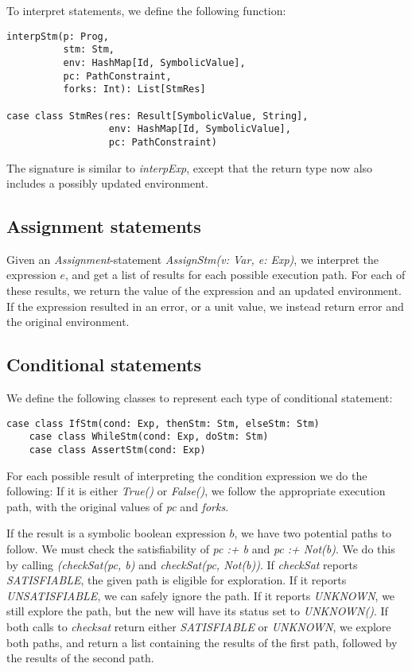 To interpret statements, we define the following function:

\begin{lstlisting}[style=simple]
interpStm(p: Prog, 
		  stm: Stm, 
		  env: HashMap[Id, SymbolicValue], 
		  pc: PathConstraint,
		  forks: Int): List[StmRes]
			  
case class StmRes(res: Result[SymbolicValue, String], 
				  env: HashMap[Id, SymbolicValue], 
				  pc: PathConstraint)
\end{lstlisting}

The signature is similar to \textsl{interpExp}, except that the return type now also includes a possibly updated environment. 

\subsection{Assignment statements}
Given an \textsl{Assignment}-statement \textsl{AssignStm(v: Var, e: Exp)}, we interpret the expression $e$, and get a list of results for each possible execution path. For each of these results, we return the value of the expression and an updated environment. If the expression resulted in an error, or a unit value, we instead return error and the original environment. 

\subsection{Conditional statements}

We define the following classes to represent each type of conditional statement:

\begin{lstlisting}[style=simple]
	case class IfStm(cond: Exp, thenStm: Stm, elseStm: Stm)
	case class WhileStm(cond: Exp, doStm: Stm)
	case class AssertStm(cond: Exp)
\end{lstlisting}
For each possible result of interpreting the condition expression we do the following: If it is either \textsl{True()} or \textsl{False()}, we follow the appropriate execution path, with the original values of \textsl{pc} and \textsl{forks}. 

\noindent If the result is a symbolic boolean expression $b$, we have two potential paths to follow. We must check the satisfiability of \textsl{pc :+ b} and \textsl{pc :+ Not(b)}. We do this by calling \textsl{(checkSat(pc, b)} and \textsl{checkSat(pc, Not(b))}. If \textsl{checkSat} reports \textsl{SATISFIABLE}, the given path is eligible for exploration. If it reports \textsl{UNSATISFIABLE}, we can safely ignore the path. If it reports \textsl{UNKNOWN}, we still explore the path, but the new \pc will have its status set to \textsl{UNKNOWN()}.
 If both calls to \textsl{checksat} return either \textsl{SATISFIABLE} or \textsl{UNKNOWN}, we explore both paths, and return a list containing the results of the first path, followed by the results of the second path.

